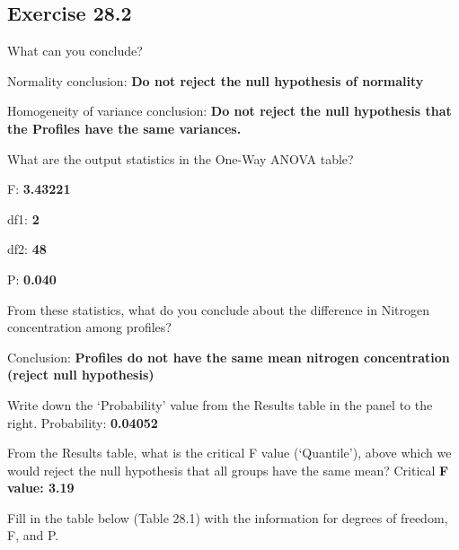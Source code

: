 \documentclass[
  openany]{scrbook}
\begin{document}
\hypertarget{exercise-28.2}{%
\subsection{Exercise 28.2}\label{exercise-28.2}}

What can you conclude?

Normality conclusion: \textbf{Do not reject the null hypothesis of normality}

Homogeneity of variance conclusion: \textbf{Do not reject the null hypothesis that the Profiles have the same variances.}

What are the output statistics in the One-Way ANOVA table?

F: \textbf{3.43221}

df1: \textbf{2}

df2: \textbf{48}

P: \textbf{0.040}

From these statistics, what do you conclude about the difference in Nitrogen concentration among profiles?

Conclusion: \textbf{Profiles do not have the same mean nitrogen concentration (reject null hypothesis)}

Write down the `Probability' value from the Results table in the panel to the right.
Probability: \textbf{0.04052}

From the Results table, what is the critical F value (`Quantile'), above which we would reject the null hypothesis that all groups have the same mean? Critical \textbf{F value: 3.19}

Fill in the table below (Table 28.1) with the information for degrees of freedom, F, and P.
\end{document}
